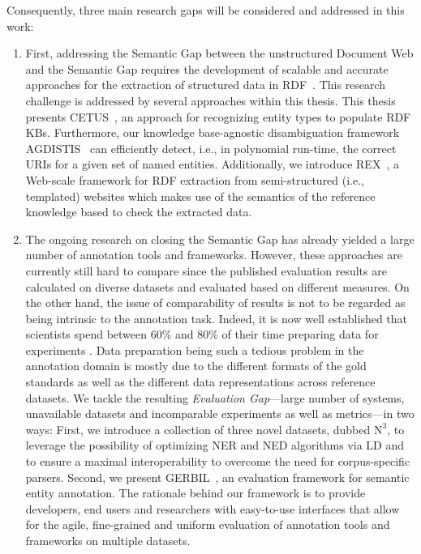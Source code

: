 Consequently, three main research gaps will be considered and addressed in this work:
\begin{enumerate}
\item 
First, addressing the Semantic Gap between the unstructured Document Web and the Semantic Gap requires the development of scalable and accurate approaches for the extraction of structured data in \ac{RDF}~\cite{rdfprimer}.
This research challenge is addressed by several approaches within this thesis.
This thesis presents CETUS~\cite{CETUS_2015}, an approach for recognizing entity types to populate \ac{RDF} \ac{KB}s. 
Furthermore, our knowledge base-agnostic disambiguation framework AGDISTIS~\cite{agdistis_iswc} can efficiently detect, i.e., in polynomial run-time, the correct URIs for a given set of named entities.
Additionally, we introduce REX~\cite{rex}, a Web-scale framework for \ac{RDF} extraction from semi-structured (i.e., templated) websites which makes use of the semantics of the reference knowledge based to check the extracted data.
\item 
The ongoing research on closing the Semantic Gap has already yielded a large number of annotation tools and frameworks.
However, these approaches are currently still hard to compare since the published evaluation results are calculated on diverse datasets and evaluated based on different measures.
On the other hand, the issue of  comparability of results is not to be regarded as being intrinsic to the annotation task. 
Indeed, it is now well established that scientists spend between 60\% and 80\% of their time preparing data for experiments \cite{GIL2014,jermyn1999preparing,peng2011reproducible}. 
Data preparation being such a tedious problem in the annotation domain is mostly due to the different formats of the gold standards as well as the different data representations across reference datasets.
We tackle the resulting \emph{Evaluation Gap}---large number of systems, unavailable datasets and incomparable experiments as well as metrics---in two ways: First, we introduce a collection of three novel datasets, dubbed $\mbox{N}^3$, to leverage the possibility of optimizing NER and NED algorithms via \ac{LD} and to ensure a maximal interoperability to overcome the need for corpus-specific parsers. 
Second, we present GERBIL~\cite{GERBIL}, an evaluation framework for semantic entity annotation. 
The rationale behind our framework is to provide developers, end users and researchers with easy-to-use interfaces that allow for the agile, fine-grained and uniform evaluation of annotation tools and frameworks on multiple datasets.

\end{enumerate}
